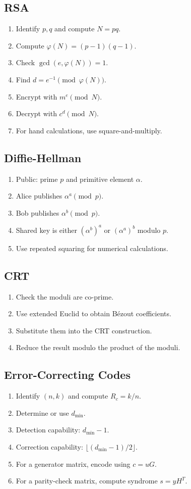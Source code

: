 \documentclass[12pt]{article}
\begin{document}
\subsection{RSA}
\begin{enumerate}
    \item Identify $p,q$ and compute $N=pq$.
    \item Compute $\varphi(N)=(p-1)(q-1)$.
    \item Check $\gcd(e,\varphi(N))=1$.
    \item Find $d=e^{-1}\pmod{\varphi(N)}$.
    \item Encrypt with $m^e\pmod N$.
    \item Decrypt with $c^d\pmod N$.
    \item For hand calculations, use square-and-multiply.
\end{enumerate}

\subsection{Diffie-Hellman}
\begin{enumerate}
    \item Public: prime $p$ and primitive element $\alpha$.
    \item Alice publishes $\alpha^a\pmod p$.
    \item Bob publishes $\alpha^b\pmod p$.
    \item Shared key is either $(\alpha^b)^a$ or $(\alpha^a)^b$ modulo $p$.
    \item Use repeated squaring for numerical calculations.
\end{enumerate}

\subsection{CRT}
\begin{enumerate}
    \item Check the moduli are co-prime.
    \item Use extended Euclid to obtain Bézout coefficients.
    \item Substitute them into the CRT construction.
    \item Reduce the result modulo the product of the moduli.
\end{enumerate}

\subsection{Error-Correcting Codes}
\begin{enumerate}
    \item Identify $(n,k)$ and compute $R_c=k/n$.
    \item Determine or use $d_{\min}$.
    \item Detection capability: $d_{\min}-1$.
    \item Correction capability: $\lfloor(d_{\min}-1)/2\rfloor$.
    \item For a generator matrix, encode using $c=uG$.
    \item For a parity-check matrix, compute syndrome $s=yH^T$.
\end{enumerate}
\end{document}
